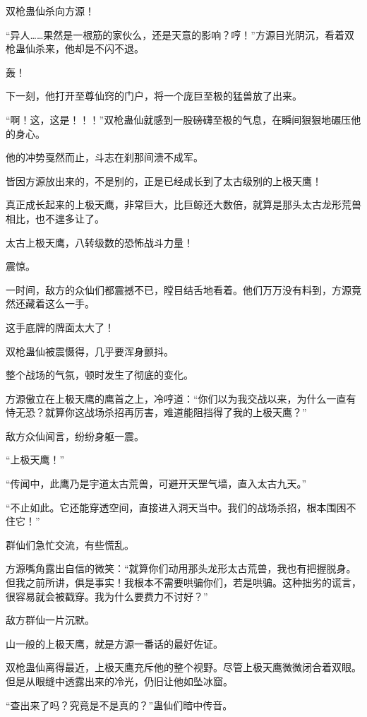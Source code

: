 
\begin{this_body}

双枪蛊仙杀向方源！

“异人……果然是一根筋的家伙么，还是天意的影响？哼！”方源目光阴沉，看着双枪蛊仙杀来，他却是不闪不退。

轰！

下一刻，他打开至尊仙窍的门户，将一个庞巨至极的猛兽放了出来。

“啊！这，这是！！！”双枪蛊仙就感到一股磅礴至极的气息，在瞬间狠狠地碾压他的身心。

他的冲势戛然而止，斗志在刹那间溃不成军。

皆因方源放出来的，不是别的，正是已经成长到了太古级别的上极天鹰！

真正成长起来的上极天鹰，非常巨大，比巨鲸还大数倍，就算是那头太古龙形荒兽相比，也不遑多让了。

太古上极天鹰，八转级数的恐怖战斗力量！

震惊。

一时间，敌方的众仙们都震撼不已，瞠目结舌地看着。他们万万没有料到，方源竟然还藏着这么一手。

这手底牌的牌面太大了！

双枪蛊仙被震慑得，几乎要浑身颤抖。

整个战场的气氛，顿时发生了彻底的变化。

方源傲立在上极天鹰的鹰首之上，冷哼道：“你们以为我交战以来，为什么一直有恃无恐？就算你这战场杀招再厉害，难道能阻挡得了我的上极天鹰？”

敌方众仙闻言，纷纷身躯一震。

“上极天鹰！”

“传闻中，此鹰乃是宇道太古荒兽，可避开天罡气墙，直入太古九天。”

“不止如此。它还能穿透空间，直接进入洞天当中。我们的战场杀招，根本围困不住它！”

群仙们急忙交流，有些慌乱。

方源嘴角露出自信的微笑：“就算你们动用那头龙形太古荒兽，我也有把握脱身。但我之前所讲，俱是事实！我根本不需要哄骗你们，若是哄骗。这种拙劣的谎言，很容易就会被戳穿。我为什么要费力不讨好？”

敌方群仙一片沉默。

山一般的上极天鹰，就是方源一番话的最好佐证。

双枪蛊仙离得最近，上极天鹰充斥他的整个视野。尽管上极天鹰微微闭合着双眼。但是从眼缝中透露出来的冷光，仍旧让他如坠冰窟。

“查出来了吗？究竟是不是真的？”蛊仙们暗中传音。


\end{this_body}
